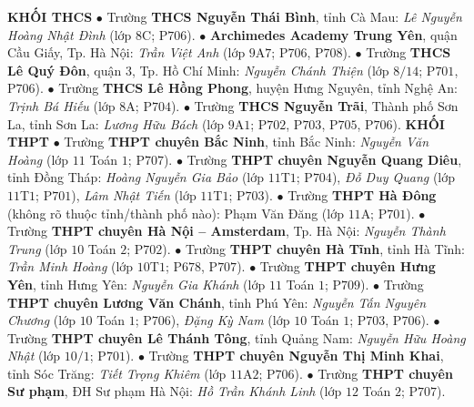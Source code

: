 \begin{multicols}{2}
	\textbf{\color{thachthuctoanhoc}KHỐI THCS}
	\vskip 0.05cm
	$\bullet$  Trường \textbf{\color{thachthuctoanhoc}THCS Nguyễn Thái Bình}, tỉnh Cà Mau: \textit{Lê Nguyễn Hoàng Nhật Đình} (lớp $8$C; P$706$).
	\vskip 0.05cm
	$\bullet$  \textbf{\color{thachthuctoanhoc}Archimedes Academy Trung Yên}, quận Cầu Giấy, Tp. Hà Nội: \textit{Trần Việt Anh} (lớp $9$A$7$; P$706$, P$708$).
	\vskip 0.05cm
	$\bullet$  Trường \textbf{\color{thachthuctoanhoc}THCS Lê Quý Đôn}, quận $3$, Tp. Hồ Chí Minh: \textit{Nguyễn Chánh Thiện} (lớp $8/14$; P$701$, P$706$).
	\vskip 0.05cm
	$\bullet$  Trường \textbf{\color{thachthuctoanhoc}THCS Lê Hồng Phong}, huyện Hưng Nguyên, tỉnh Nghệ An: \textit{Trịnh Bá Hiếu} (lớp $8$A; P$704$).
	\vskip 0.05cm
	$\bullet$  Trường \textbf{\color{thachthuctoanhoc}THCS Nguyễn Trãi}, Thành phố Sơn La, tỉnh Sơn La: \textit{Lương Hữu Bách} (lớp $9$A$1$; P$702$, P$703$, P$705$, P$706$).
	\vskip 0.05cm
	\textbf{\color{thachthuctoanhoc}KHỐI THPT}
	\vskip 0.05cm
	$\bullet$  Trường \textbf{\color{thachthuctoanhoc}THPT chuyên Bắc Ninh}, tỉnh Bắc Ninh: \textit{Nguyễn Văn Hoàng} (lớp $11$ Toán $1$; P$707$).
	\vskip 0.05cm
	$\bullet$  Trường \textbf{\color{thachthuctoanhoc}THPT chuyên Nguyễn Quang Diêu}, tỉnh Đồng Tháp: \textit{Hoàng Nguyễn Gia Bảo} (lớp $11$T$1$; P$704$), \textit{Đỗ Duy Quang} (lớp $11$T$1$; P$701$), \textit{Lâm Nhật Tiến} (lớp $11$T$1$; P$703$).
	\vskip 0.05cm
	$\bullet$  Trường \textbf{\color{thachthuctoanhoc}THPT Hà Đông} (không rõ thuộc tỉnh/thành phố nào): Phạm Văn Đăng (lớp $11$A; P$701$).
	\vskip 0.05cm
	$\bullet$  Trường \textbf{\color{thachthuctoanhoc}THPT chuyên Hà Nội -- Amsterdam}, Tp. Hà Nội: \textit{Nguyễn Thành Trung} (lớp $10$ Toán $2$; P$702$).
	\vskip 0.05cm
	$\bullet$  Trường \textbf{\color{thachthuctoanhoc}THPT chuyên Hà Tĩnh}, tỉnh Hà Tĩnh: \textit{Trần Minh Hoàng} (lớp $10$T$1$; P$678$, P$707$).
	\vskip 0.05cm
	$\bullet$  Trường \textbf{\color{thachthuctoanhoc}THPT chuyên Hưng Yên}, tỉnh Hưng Yên: \textit{Nguyễn Gia Khánh} (lớp $11$ Toán $1$; P$709$).
	\vskip 0.05cm
	$\bullet$  Trường \textbf{\color{thachthuctoanhoc}THPT chuyên Lương Văn Chánh}, tỉnh Phú Yên: \textit{Nguyễn Tấn Nguyên Chương} (lớp $10$ Toán $1$; P$706$), \textit{Đặng Kỳ Nam} (lớp $10$ Toán $1$; P$703$, P$706$).
	\vskip 0.05cm
	$\bullet$  Trường \textbf{\color{thachthuctoanhoc}THPT chuyên Lê Thánh Tông}, tỉnh Quảng Nam: \textit{Nguyễn Hữu Hoàng Nhật} (lớp $10/1$; P$701$).
	\vskip 0.05cm
	$\bullet$  Trường \textbf{\color{thachthuctoanhoc}THPT chuyên Nguyễn Thị Minh Khai}, tỉnh Sóc Trăng: \textit{Tiết Trọng Khiêm} (lớp $11$A$2$; P$706$).
	\vskip 0.05cm
	$\bullet$  Trường \textbf{\color{thachthuctoanhoc}THPT chuyên Sư phạm}, ĐH Sư phạm Hà Nội: \textit{Hồ Trần Khánh Linh} (lớp $12$ Toán $2$; P$707$).
\end{multicols}
